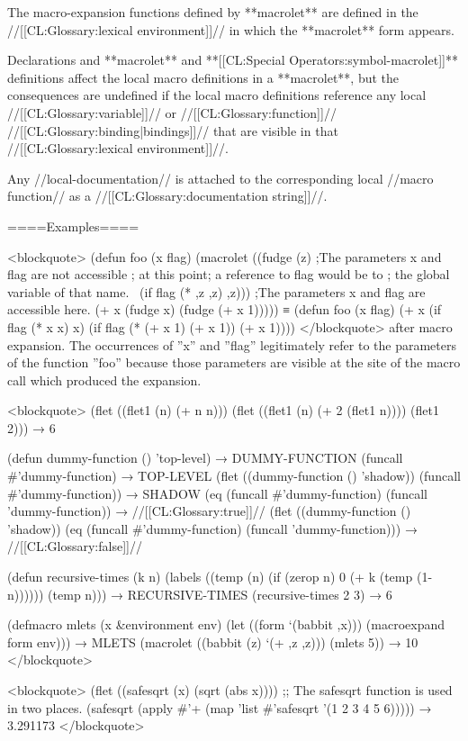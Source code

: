 The macro-expansion functions defined by **macrolet** are defined in the //[[CL:Glossary:lexical environment]]// in which the **macrolet** form appears.

Declarations and **macrolet** and **[[CL:Special Operators:symbol-macrolet]]** definitions affect the local macro definitions in a **macrolet**, but the consequences are undefined if the local macro definitions reference any local //[[CL:Glossary:variable]]// or //[[CL:Glossary:function]]// //[[CL:Glossary:binding|bindings]]// that are visible in that //[[CL:Glossary:lexical environment]]//.

Any //local-documentation// is attached to the corresponding local //macro function// as a //[[CL:Glossary:documentation string]]//.

====Examples====

<blockquote> (defun foo (x flag) (macrolet ((fudge (z) ;The parameters x and flag are not accessible ; at this point; a reference to flag would be to ; the global variable of that name. \bq\ (if flag (* ,z ,z) ,z))) ;The parameters x and flag are accessible here. (+ x (fudge x) (fudge (+ x 1))))) ≡ (defun foo (x flag) (+ x (if flag (* x x) x) (if flag (* (+ x 1) (+ x 1)) (+ x 1)))) </blockquote> after macro expansion. The occurrences of ''x'' and ''flag'' legitimately refer to the parameters of the function ''foo'' because those parameters are visible at the site of the macro call which produced the expansion.

<blockquote> (flet ((flet1 (n) (+ n n))) (flet ((flet1 (n) (+ 2 (flet1 n)))) (flet1 2))) → 6

(defun dummy-function () 'top-level) → DUMMY-FUNCTION (funcall #'dummy-function) → TOP-LEVEL (flet ((dummy-function () 'shadow)) (funcall #'dummy-function)) → SHADOW (eq (funcall #'dummy-function) (funcall 'dummy-function)) → //[[CL:Glossary:true]]// (flet ((dummy-function () 'shadow)) (eq (funcall #'dummy-function) (funcall 'dummy-function))) → //[[CL:Glossary:false]]//

(defun recursive-times (k n) (labels ((temp (n) (if (zerop n) 0 (+ k (temp (1- n)))))) (temp n))) → RECURSIVE-TIMES (recursive-times 2 3) → 6

(defmacro mlets (x &environment env) (let ((form `(babbit ,x))) (macroexpand form env))) → MLETS (macrolet ((babbit (z) `(+ ,z ,z))) (mlets 5)) → 10 </blockquote>

<blockquote> (flet ((safesqrt (x) (sqrt (abs x)))) ;; The safesqrt function is used in two places. (safesqrt (apply #'+ (map 'list #'safesqrt '(1 2 3 4 5 6))))) → 3.291173 </blockquote>

